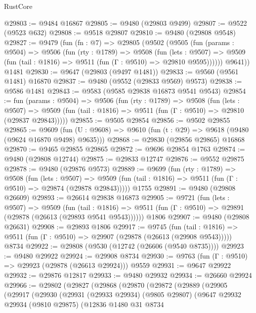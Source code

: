 \begin{lexlean}{RustCore}
\begin{coremodule}
@29803 := @9484 @16867
@29805 := @9480 (@29803 @9499)
@29807 := @9522 (@9523 @632)
@29808 := @9518 @29807
@29810 := @9480 (@29808 @9548)
@29827 := @9479
    (fun (fn : @7) =>
    @29805
      (@9502
        (@9505
          (fun (params : @9504) =>
          @9506
            (fun (rty : @1789) =>
            @9508
              (fun (lets : @9507) =>
              @9509 (fun (tail : @1816) => @9511 (fun (Γ : @9510) => @29810 @9595))))))
        @9641))
    @1481
@29830 := @9647 (@29803 (@9497 @1481))
@29833 := @9560 (@9561 @1481) @16870
@29837 := @9480 (@9552 (@29833 @9569) @9573)
@29838 := @9586 @1481
@29843 := @9583 (@9585 @29838 @16873 @9541 @9543)
@29854 := fun (params : @9504) =>
  @9506
    (fun (rty : @1789) =>
    @9508
      (fun (lets : @9507) =>
      @9509 (fun (tail : @1816) => @9511 (fun (Γ : @9510) => @29810 (@29837 @29843)))))
@29855 := @9505 @29854
@29856 := @9502 @29855
@29865 := @9609
    (fun (U : @9608) => @9610 (fun (t : @29) => @9618 (@9480 (@9624 @16870 @9498) @9635)))
@29868 := @29830 (@29856 @29865) @16868
@29870 := @9465 @29855 @29865
@29872 := @9696 @29854 @1763
@29874 := @9480 (@29808 @12744)
@29875 := @29833 @12747
@29876 := @9552 @29875
@29878 := @9480 (@29876 @9573)
@29889 := @9699
    (fun (rty : @1789) =>
    @9508
      (fun (lets : @9507) =>
      @9509 (fun (tail : @1816) => @9511 (fun (Γ : @9510) => @29874 (@29878 @29843)))))
    @1755
@29891 := @9480 (@29808 @26609)
@29893 := @26614 @29838 @16873
@29905 := @9721
    (fun (lets : @9507) =>
    @9509
      (fun (tail : @1816) =>
      @9511 (fun (Γ : @9510) => @29891 (@29878 (@26613 (@29893 @9541 @9543))))))
    @1806
@29907 := @9480 (@29808 @26631)
@29908 := @29893 @1806
@29917 := @9745
    (fun (tail : @1816) => @9511 (fun (Γ : @9510) => @29907 (@29878 (@26613 (@29908 @9543)))))
    @8734
@29922 := @29808 (@9530 (@12742 (@26606 (@9540 @8735))))
@29923 := @9480 @29922
@29924 := @29908 @8734
@29930 := @9763 (fun (Γ : @9510) => @29923 (@29878 (@26613 @29924))) @9559
@29931 := @9647 @29922
@29932 := @29876 @12817
@29933 := @9480 @29932
@29934 := @26660 @29924
@29966 := @29802
    (@29827
      (@29868
        (@29870
          (@29872
            (@29889
              (@29905
                (@29917
                  (@29930
                    (@29931
                      (@29933 @29934)
                      (@9805 @29807)
                      (@9647
                        @29932
                        @29934
                        (@9810 @29875)
                        (@12836
                          @1480
                          @31
                          @8734

\end{coremodule}
\end{lexlean}
